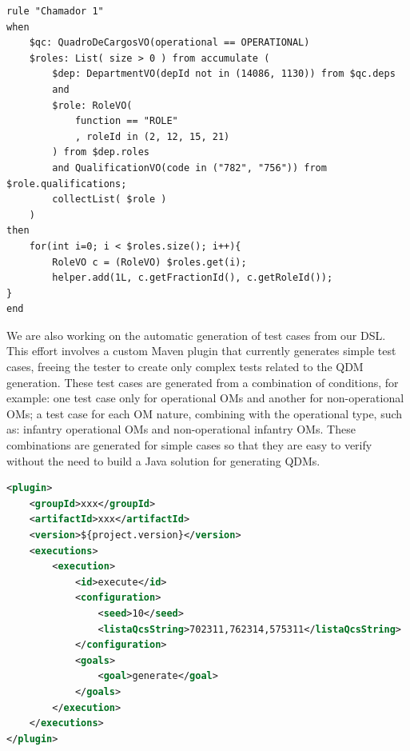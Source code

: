 \begin{lstlisting}[frame=single, language=DRL, caption={\it DRL generated}, label={code:drl}, basicstyle=\scriptsize]
rule "Chamador 1"   	
when
	$qc: QuadroDeCargosVO(operational == OPERATIONAL)	
	$roles: List( size > 0 ) from accumulate ( 
		$dep: DepartmentVO(depId not in (14086, 1130)) from $qc.deps				  		   
		and
		$role: RoleVO(
			function == "ROLE"
			, roleId in (2, 12, 15, 21)  
		) from $dep.roles 		
		and QualificationVO(code in ("782", "756")) from $role.qualifications;				
		collectList( $role )
	) 		
then		 
	for(int i=0; i < $roles.size(); i++){       	
		RoleVO c = (RoleVO) $roles.get(i);
		helper.add(1L, c.getFractionId(), c.getRoleId());   
}               
end	\end{lstlisting}


We are also working on the automatic generation of test cases 
from our DSL. This effort involves a custom Maven plugin that currently generates simple test cases, 
freeing the tester to create only complex tests related to the QDM generation. 
These test cases are generated from a combination of conditions, for example: one test case only for operational OMs 
and another for non-operational OMs; a test case for each OM nature, combining with the operational type, 
such as: infantry operational OMs and non-operational infantry OMs. These combinations are generated for simple 
cases so that they are easy to verify without the need to build a Java solution for generating QDMs. 


\begin{lstlisting}[frame=single, language=XML, caption={\it Maven plugin for test generation}, label={code:plugin},basicstyle=\scriptsize]
<plugin>
	<groupId>xxx</groupId>
	<artifactId>xxx</artifactId>
	<version>${project.version}</version>
	<executions>
		<execution>
			<id>execute</id>			
			<configuration>
				<seed>10</seed>				
				<listaQcsString>702311,762314,575311</listaQcsString>				
			</configuration>
			<goals>
				<goal>generate</goal>
			</goals>
		</execution>
	</executions>
</plugin>	
\end{lstlisting}



